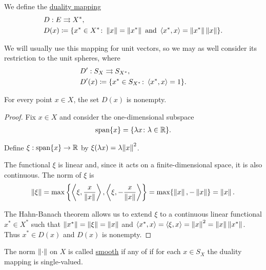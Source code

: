 \begin{definition}\cite[Example 2.26]{Phelps1993}
  We define the \uline{duality mapping}
  \begin{align*}
    &D: E \rightrightarrows X^*, \\
    &D(x) \coloneqq \{ x^* \in X^* \colon \left\Vert x \right\Vert = \left\Vert x^* \right\Vert \text{ and } \left\langle x^*, x \right\rangle = \left\Vert x^* \right\Vert \left\Vert x \right\Vert \}.
  \end{align*}
\end{definition}

\begin{note}
  We will usually use this mapping for unit vectors, so we may as well consider its restriction to the unit spheres, where
  \begin{align*}
    &D': S_X \rightrightarrows S_{X^*}, \\
    &D'(x) \coloneqq \{ x^* \in S_{X^*} \colon \left\langle x^*, x \right\rangle = 1 \}.
  \end{align*}
\end{note}

\begin{lemma}\label{thm:nonempty_banach_duality_mapping}
  For every point $x \in X$, the set $D(x)$ is nonempty.
\end{lemma}
\begin{proof}
  Fix $x \in X$ and consider the one-dimensional subspace
  \begin{align*}
    \operatorname{span} \{ x \}
    =
    \{ \lambda x \colon \lambda \in \mathbb{R} \}.
  \end{align*}

  Define $\xi: \operatorname{span} \{ x \} \to \mathbb{R}$ by $\xi(\lambda x) = \lambda {\left\Vert x \right\Vert}^2$.

  The functional $\xi$ is linear and, since it acts on a finite-dimensional space, it is also continuous. The norm of $\xi$ is
  \begin{align*}
    \left\Vert \xi \right\Vert = \max \left\{ \left\langle \xi, \frac x {\left\Vert x \right\Vert} \right\rangle, \left\langle \xi, -\frac x {\left\Vert x \right\Vert} \right\rangle \right\} = \max \{ \left\Vert x \right\Vert, -\left\Vert x \right\Vert \} = \left\Vert x \right\Vert.
  \end{align*}

  The Hahn-Banach theorem allows us to extend $\xi$ to a continuous linear functional $x^* \in X^*$ such that $\left\Vert x^* \right\Vert = \left\Vert \xi \right\Vert = \left\Vert x \right\Vert$ and $\left\langle x^*, x \right\rangle = \left\langle \xi, x \right\rangle = \left\Vert x \right\Vert^2 = \left\Vert x \right\Vert \left\Vert x^* \right\Vert$. Thus $x^* \in D(x)$ and $D(x)$ is nonempty.
\end{proof}

\begin{definition}\label{def:smooth_norm}\cite[Definition 2.36]{Phelps1993}
  The norm $\left\Vert \cdot \right\Vert$ on $X$ is called \uline{smooth} if any of  if for each $x \in S_X$ the duality mapping is single-valued.
\end{definition}

